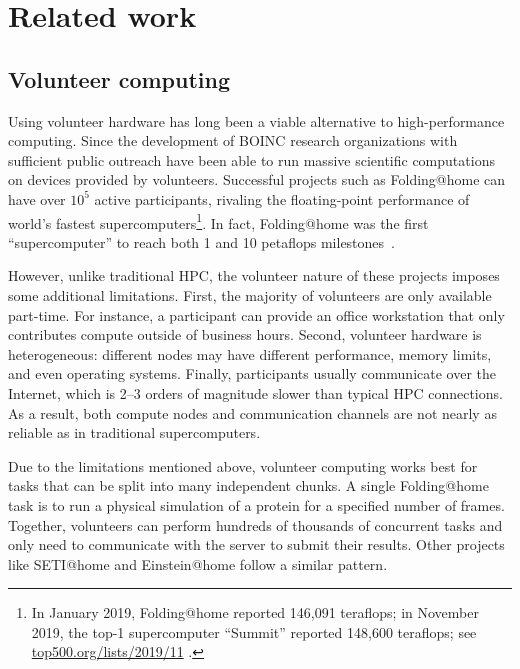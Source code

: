 \vspace{-14px}
\section{Related work}\label{sect:related}
\vspace{-4px}

\subsection{Volunteer computing}\label{sect:related_volunteer}
\vspace{-4px}

Using volunteer hardware has long been a viable alternative to high-performance computing. Since the development of BOINC \cite{anderson2004boinc} research organizations with sufficient public outreach have been able to run massive scientific computations on devices provided by volunteers. Successful projects such as Folding@home can have over $10^5$ active participants, rivaling the floating-point performance of world's fastest supercomputers\footnote{In January 2019, Folding@home reported 146,091 teraflops; in November 2019, the top-1 supercomputer ``Summit'' reported 148,600 teraflops; see \url{top500.org/lists/2019/11} .}. In fact, Folding@home was the first ``supercomputer'' to reach both 1 and 10 petaflops milestones~\cite{folding_timeline}.

However, unlike traditional HPC, the volunteer nature of these projects imposes some additional limitations. First, the majority of volunteers are only available part-time. 
For instance, a participant can provide an office workstation that only contributes compute outside of business hours. 
Second, volunteer hardware is heterogeneous: different nodes may have different performance, memory limits, and even operating systems. Finally, participants usually communicate over the Internet, which is 2--3 orders of magnitude slower than typical HPC connections. As a result, both compute nodes and communication channels are not nearly as reliable as in traditional supercomputers. 

Due to the limitations mentioned above, volunteer computing works best for tasks that can be split into many independent chunks. A single Folding@home task is to run a physical simulation of a protein for a specified number of frames. Together, volunteers can perform hundreds of thousands of concurrent tasks and only need to communicate with the server to submit their results. Other projects like SETI@home and Einstein@home follow a similar pattern.%

